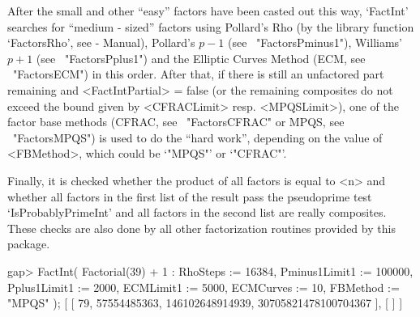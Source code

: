 After the small and other ``easy'' factors have been casted out 
this way, `FactInt' searches for ``medium - sized'' factors using
Pollard's Rho (by the library function `FactorsRho',
see {\GAP} - Manual),
Pollard's $p-1$ (see ~"FactorsPminus1"), Williams' $p+1$ 
(see ~"FactorsPplus1") and the Elliptic Curves Method 
(ECM, see ~"FactorsECM") in this order.
After that, if there is still an unfactored part remaining and
<FactIntPartial> = false (or the remaining composites do not
exceed the bound given by <CFRACLimit> resp. <MPQSLimit>), 
one of the factor base methods (CFRAC, see ~"FactorsCFRAC" or 
MPQS, see ~"FactorsMPQS") is used to do the ``hard work'', depending
on the value of <FBMethod>, which could be `"MPQS"' or `"CFRAC"'.

Finally, it is checked whether the product of all factors
is equal to <n> and whether all factors in the first list of the
result pass the {\GAP} pseudoprime test `IsProbablyPrimeInt'
and all factors in the second list are really composites.
These checks are also done by all other factorization routines
provided by this package.  

\beginexample
gap> FactInt( Factorial(39) + 1 : RhoSteps := 16384, Pminus1Limit1 := 100000,
              Pplus1Limit1 := 2000, ECMLimit1 := 5000, ECMCurves := 10,
              FBMethod := "MPQS" );
[ [ 79, 57554485363, 146102648914939, 30705821478100704367 ], [  ] ]
\endexample

